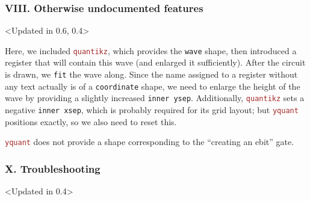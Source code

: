 \documentclass{scrartcl}
\makeatletter
\newenvironment{codeexample*}{%
   \VerbatimEnvironment%
   \let\FVB@VerbatimOut\minted@FVB@VerbatimOut
   \let\FVE@VerbatimOut\minted@FVE@VerbatimOut
   \minted@configlang{tex}%
   \minted@fvset
   \begin{VerbatimOut}[codes={\catcode`\^^I=12},firstline,lastline]{\minted@jobname.pyg}%
}{
   \end{VerbatimOut}%
   \minted@langlinenoson%
   \begin{adjustbox}{center}
       \minted@jobname.pyg %
   \end{adjustbox}\nopagebreak
   \expandafter\minted@pygmentize\expandafter{\minted@lang}%
   \minted@langlinenosoff%
   \par%
}
\def\pkg#1{\textcolor{brown}{\texttt{#1}}}
\def\Yquant{\pkg{yquant}}
\makeatother
\begin{document}
         \subsubsection{VIII. Otherwise undocumented features}
            \begin{example}<Updated in 0.6, 0.4>
               \begin{codeexample*}
               \end{codeexample*}
               Here, we included \pkg{quantikz}, which provides the \texttt{wave} shape, then introduced a register that will contain this wave (and enlarged it sufficiently).
               After the circuit is drawn, we \texttt{fit} the wave along.
               Since the name assigned to a register without any text actually is of a \texttt{coordinate} shape, we need to enlarge the height of the wave by providing a slightly increased \texttt{inner ysep}.
               Additionally, \pkg{quantikz} sets a negative \texttt{inner xsep}, which is probably required for its grid layout; but \Yquant{} positions exactly, so we also need to reset this.
            \end{example}

            \Yquant{} does not provide a shape corresponding to the ``creating an ebit'' gate.

         \clearpage
         \subsubsection{X. Troubleshooting}
            \begin{example}<Updated in 0.4>
               \begin{codeexample*}
               \end{codeexample*}
            \end{example}
      \endgroup
\end{document}
